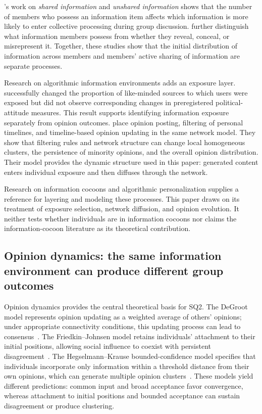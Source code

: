 \documentclass[11pt,a4paper]{article}
\newcommand{\term}[1]{\textit{#1}}
\begin{document}
\citet{stasser1985}'s work on \term{shared information} and \term{unshared information} shows that the number of members who possess an information item affects which information is more likely to enter collective processing during group discussion. \citet{steinel2010} further distinguish what information members possess from whether they reveal, conceal, or misrepresent it. Together, these studies show that the initial distribution of information across members and members' active sharing of information are separate processes.

Research on algorithmic information environments adds an exposure layer. \citet{nyhan2023} successfully changed the proportion of like-minded sources to which users were exposed but did not observe corresponding changes in preregistered political-attitude measures. This result supports identifying information exposure separately from opinion outcomes. \citet{perra2019} place opinion posting, filtering of personal timelines, and timeline-based opinion updating in the same network model. They show that filtering rules and network structure can change local homogeneous clusters, the persistence of minority opinions, and the overall opinion distribution. Their model provides the dynamic structure used in this paper: generated content enters individual exposure and then diffuses through the network.

Research on information cocoons and algorithmic personalization supplies a reference for layering and modeling these processes. This paper draws on its treatment of exposure selection, network diffusion, and opinion evolution. It neither tests whether individuals are in information cocoons nor claims the information-cocoon literature as its theoretical contribution.

\subsection{Opinion dynamics: the same information environment can produce different group outcomes}

Opinion dynamics provides the central theoretical basis for SQ2. The DeGroot model represents opinion updating as a weighted average of others' opinions; under appropriate connectivity conditions, this updating process can lead to consensus~\citep{degroot1974}. The Friedkin--Johnsen model retains individuals' attachment to their initial positions, allowing social influence to coexist with persistent disagreement~\citep{friedkin1990}. The Hegselmann--Krause bounded-confidence model specifies that individuals incorporate only information within a threshold distance from their own opinions, which can generate multiple opinion clusters~\citep{hegselmann2002}. These models yield different predictions: common input and broad acceptance favor convergence, whereas attachment to initial positions and bounded acceptance can sustain disagreement or produce clustering.
\end{document}

